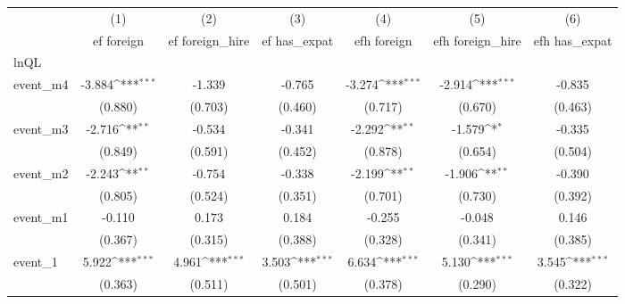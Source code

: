 {
\def\sym#1{\ifmmode^{#1}\else\(^{#1}\)\fi}
\begin{tabular}{l*{6}{c}}
\hline\hline
            &\multicolumn{1}{c}{(1)}&\multicolumn{1}{c}{(2)}&\multicolumn{1}{c}{(3)}&\multicolumn{1}{c}{(4)}&\multicolumn{1}{c}{(5)}&\multicolumn{1}{c}{(6)}\\
            &\multicolumn{1}{c}{ef foreign}&\multicolumn{1}{c}{ef foreign\_hire}&\multicolumn{1}{c}{ef has\_expat}&\multicolumn{1}{c}{efh foreign}&\multicolumn{1}{c}{efh foreign\_hire}&\multicolumn{1}{c}{efh has\_expat}\\
\hline
lnQL        &                     &                     &                     &                     &                     &                     \\
event\_m4    &      -3.884\sym{***}&      -1.339         &      -0.765         &      -3.274\sym{***}&      -2.914\sym{***}&      -0.835         \\
            &     (0.880)         &     (0.703)         &     (0.460)         &     (0.717)         &     (0.670)         &     (0.463)         \\
[1em]
event\_m3    &      -2.716\sym{**} &      -0.534         &      -0.341         &      -2.292\sym{**} &      -1.579\sym{*}  &      -0.335         \\
            &     (0.849)         &     (0.591)         &     (0.452)         &     (0.878)         &     (0.654)         &     (0.504)         \\
[1em]
event\_m2    &      -2.243\sym{**} &      -0.754         &      -0.338         &      -2.199\sym{**} &      -1.906\sym{**} &      -0.390         \\
            &     (0.805)         &     (0.524)         &     (0.351)         &     (0.701)         &     (0.730)         &     (0.392)         \\
[1em]
event\_m1    &      -0.110         &       0.173         &       0.184         &      -0.255         &      -0.048         &       0.146         \\
            &     (0.367)         &     (0.315)         &     (0.388)         &     (0.328)         &     (0.341)         &     (0.385)         \\
[1em]
event\_1     &       5.922\sym{***}&       4.961\sym{***}&       3.503\sym{***}&       6.634\sym{***}&       5.130\sym{***}&       3.545\sym{***}\\
            &     (0.363)         &     (0.511)         &     (0.501)         &     (0.378)         &     (0.290)         &     (0.322)         \\

\end{tabular}}
